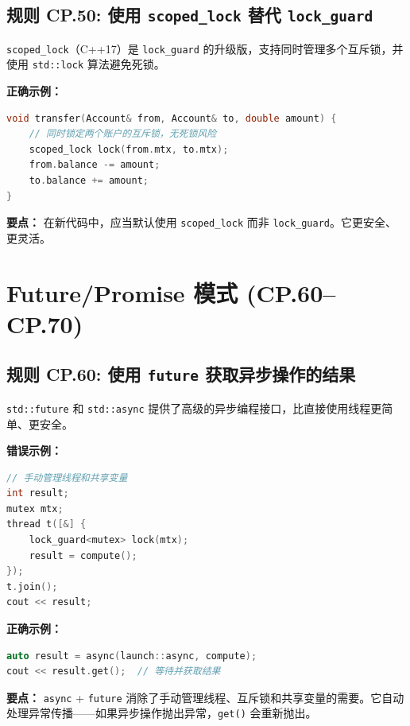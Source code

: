 \subsection*{\textbf{规则 CP.50:} 使用 \texttt{scoped\_lock} 替代 \texttt{lock\_guard}}

\texttt{scoped\_lock}（C++17）是 \texttt{lock\_guard} 的升级版，支持同时管理多个互斥锁，并使用 \texttt{std::lock} 算法避免死锁。

\textbf{正确示例：}

\begin{lstlisting}[language=C++]
void transfer(Account& from, Account& to, double amount) {
    // 同时锁定两个账户的互斥锁，无死锁风险
    scoped_lock lock(from.mtx, to.mtx);
    from.balance -= amount;
    to.balance += amount;
}
\end{lstlisting}

\textbf{要点：} 在新代码中，应当默认使用 \texttt{scoped\_lock} 而非 \texttt{lock\_guard}。它更安全、更灵活。

\section{Future/Promise 模式 (CP.60--CP.70)}

\subsection*{\textbf{规则 CP.60:} 使用 \texttt{future} 获取异步操作的结果}

\texttt{std::future} 和 \texttt{std::async} 提供了高级的异步编程接口，比直接使用线程更简单、更安全。

\textbf{错误示例：}

\begin{lstlisting}[language=C++]
// 手动管理线程和共享变量
int result;
mutex mtx;
thread t([&] {
    lock_guard<mutex> lock(mtx);
    result = compute();
});
t.join();
cout << result;
\end{lstlisting}

\textbf{正确示例：}

\begin{lstlisting}[language=C++]
auto result = async(launch::async, compute);
cout << result.get();  // 等待并获取结果
\end{lstlisting}

\textbf{要点：} \texttt{async} + \texttt{future} 消除了手动管理线程、互斥锁和共享变量的需要。它自动处理异常传播——如果异步操作抛出异常，\texttt{get()} 会重新抛出。

